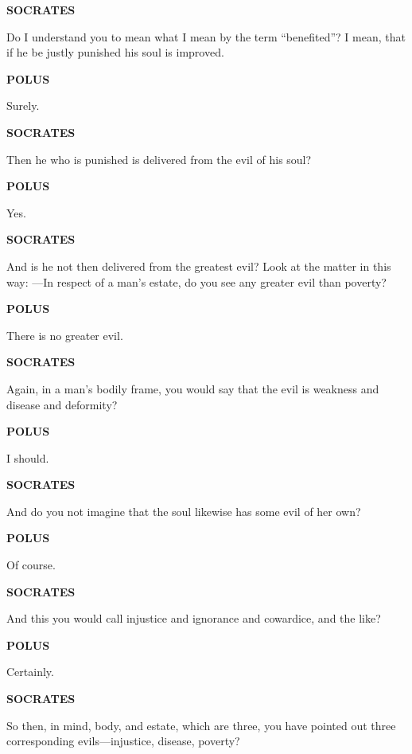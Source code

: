 \documentclass[11pt,letter]{article}
\begin{document}
\par \textbf{SOCRATES}
\par   Do I understand you to mean what I mean by the term “benefited”? I mean, that if he be justly punished his soul is improved.

\par \textbf{POLUS}
\par   Surely.

\par \textbf{SOCRATES}
\par   Then he who is punished is delivered from the evil of his soul?

\par \textbf{POLUS}
\par   Yes.

\par \textbf{SOCRATES}
\par   And is he not then delivered from the greatest evil? Look at the matter in this way: —In respect of a man’s estate, do you see any greater evil than poverty?

\par \textbf{POLUS}
\par   There is no greater evil.

\par \textbf{SOCRATES}
\par   Again, in a man’s bodily frame, you would say that the evil is weakness and disease and deformity?

\par \textbf{POLUS}
\par   I should.

\par \textbf{SOCRATES}
\par   And do you not imagine that the soul likewise has some evil of her own?

\par \textbf{POLUS}
\par   Of course.

\par \textbf{SOCRATES}
\par   And this you would call injustice and ignorance and cowardice, and the like?

\par \textbf{POLUS}
\par   Certainly.

\par \textbf{SOCRATES}
\par   So then, in mind, body, and estate, which are three, you have pointed out three corresponding evils—injustice, disease, poverty?
\end{document}
